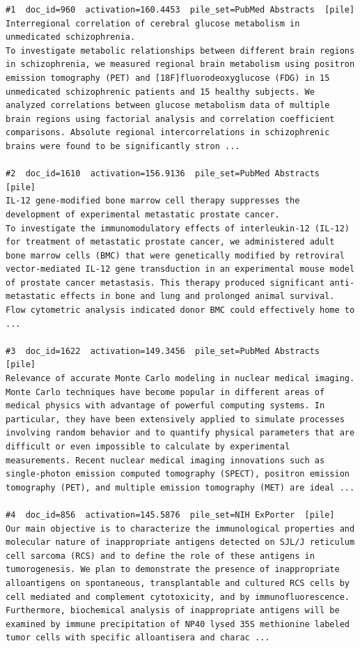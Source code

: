 \begin{verbatim}
#1  doc_id=960  activation=160.4453  pile_set=PubMed Abstracts  [pile]
Interregional correlation of cerebral glucose metabolism in unmedicated schizophrenia.
To investigate metabolic relationships between different brain regions in schizophrenia, we measured regional brain metabolism using positron emission tomography (PET) and [18F]fluorodeoxyglucose (FDG) in 15 unmedicated schizophrenic patients and 15 healthy subjects. We analyzed correlations between glucose metabolism data of multiple brain regions using factorial analysis and correlation coefficient comparisons. Absolute regional intercorrelations in schizophrenic brains were found to be significantly stron ...

#2  doc_id=1610  activation=156.9136  pile_set=PubMed Abstracts  [pile]
IL-12 gene-modified bone marrow cell therapy suppresses the development of experimental metastatic prostate cancer.
To investigate the immunomodulatory effects of interleukin-12 (IL-12) for treatment of metastatic prostate cancer, we administered adult bone marrow cells (BMC) that were genetically modified by retroviral vector-mediated IL-12 gene transduction in an experimental mouse model of prostate cancer metastasis. This therapy produced significant anti-metastatic effects in bone and lung and prolonged animal survival. Flow cytometric analysis indicated donor BMC could effectively home to ...

#3  doc_id=1622  activation=149.3456  pile_set=PubMed Abstracts  [pile]
Relevance of accurate Monte Carlo modeling in nuclear medical imaging.
Monte Carlo techniques have become popular in different areas of medical physics with advantage of powerful computing systems. In particular, they have been extensively applied to simulate processes involving random behavior and to quantify physical parameters that are difficult or even impossible to calculate by experimental measurements. Recent nuclear medical imaging innovations such as single-photon emission computed tomography (SPECT), positron emission tomography (PET), and multiple emission tomography (MET) are ideal ...

#4  doc_id=856  activation=145.5876  pile_set=NIH ExPorter  [pile]
Our main objective is to characterize the immunological properties and molecular nature of inappropriate antigens detected on SJL/J reticulum cell sarcoma (RCS) and to define the role of these antigens in tumorogenesis. We plan to demonstrate the presence of inappropriate alloantigens on spontaneous, transplantable and cultured RCS cells by cell mediated and complement cytotoxicity, and by immunofluorescence. Furthermore, biochemical analysis of inappropriate antigens will be examined by immune precipitation of NP40 lysed 35S methionine labeled tumor cells with specific alloantisera and charac ...


\end{verbatim}
